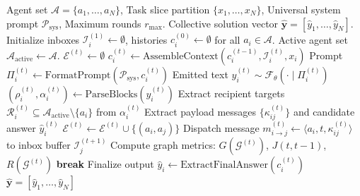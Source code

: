 \documentclass{ieeeaccess}
\begin{document}
\begin{algorithm}[t]
\caption{ORCHESTRA Decentralized Interaction Engine}
\label{alg:orchestra_runtime}
\begin{algorithmic}[1]
\REQUIRE Agent set $\mathcal{A} = \{a_1, \dots, a_N\}$, Task slice partition $\{x_1, \dots, x_N\}$, Universal system prompt $\mathcal{P}_{\text{sys}}$, Maximum rounds $r_{\max}$.
\ENSURE Collective solution vector $\mathbf{\hat{y}} = [\hat{y}_1, \dots, \hat{y}_N]$.
\STATE Initialize inboxes $\mathcal{I}_i^{(1)} \leftarrow \emptyset$, histories $c_i^{(0)} \leftarrow \emptyset$ for all $a_i \in \mathcal{A}$.
\STATE Active agent set $\mathcal{A}_{\text{active}} \leftarrow \mathcal{A}$.
    \STATE $\mathcal{E}^{(t)} \leftarrow \emptyset$
        \STATE $c_i^{(t)} \leftarrow \text{AssembleContext}(c_i^{(t-1)}, \mathcal{I}_i^{(t)}, x_i)$
        \STATE Prompt $\Pi_i^{(t)} \leftarrow \text{FormatPrompt}(\mathcal{P}_{\text{sys}}, c_i^{(t)})$
        \STATE Emitted text $y_i^{(t)} \sim \mathcal{F}_{\theta}(\cdot \mid \Pi_i^{(t)})$
        \STATE $(\rho_i^{(t)}, \alpha_i^{(t)}) \leftarrow \text{ParseBlocks}(y_i^{(t)})$
        \STATE Extract recipient targets $\mathcal{R}_i^{(t)} \subseteq \mathcal{A}_{\text{active}} \setminus \{a_i\}$ from $\alpha_i^{(t)}$
        \STATE Extract payload messages $\{ \kappa_{ij}^{(t)} \}$ and candidate answer $\hat{y}_i^{(t)}$
            \STATE $\mathcal{E}^{(t)} \leftarrow \mathcal{E}^{(t)} \cup \{(a_i, a_j)\}$
            \STATE Dispatch message $m_{i \to j}^{(t)} \leftarrow \langle a_i, t, \kappa_{ij}^{(t)} \rangle$ to inbox buffer $\mathcal{I}_j^{(t+1)}$
        \ENDFOR
    \ENDFOR
    \STATE Compute graph metrics: $G(\mathcal{G}^{(t)})$, $J(t, t-1)$, $R(\mathcal{G}^{(t)})$
        \STATE \textbf{break}
    \ENDIF
\ENDFOR
{}
    \STATE Finalize output $\hat{y}_i \leftarrow \text{ExtractFinalAnswer}(c_i^{(t)})$
\ENDFOR
\RETURN $\mathbf{\hat{y}} = [\hat{y}_1, \dots, \hat{y}_N]$
\end{algorithmic}
\end{algorithm}
\end{document}

